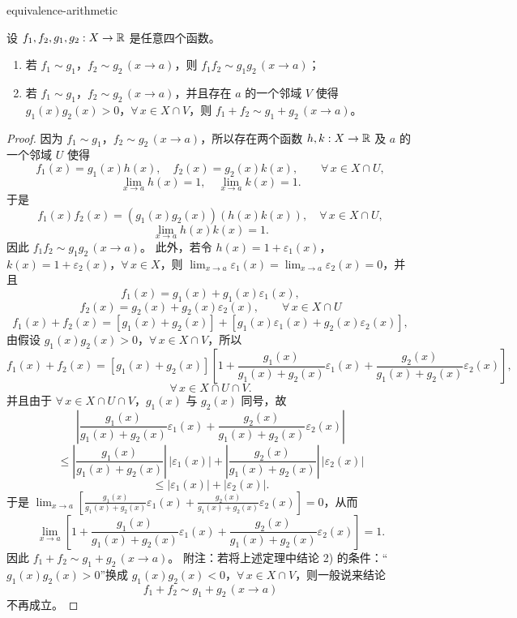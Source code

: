 \begin{mythm}{}{equivalence-arithmetic}

设 $f_1,f_2,g_1,g_2:X\to\mathbb{R}$ 是任意四个函数。

\begin{enumerate}[label=\arabic{enumi})]
\item 若 $f_1\sim g_1$，$f_2\sim g_2\,(x\to a)$，则 $f_1f_2\sim g_1g_2\,(x\to a)$；
\item 若 $f_1\sim g_1$，$f_2\sim g_2\,(x\to a)$，并且存在 $a$ 的一个邻域 $V$ 使得 $g_1(x)g_2(x)>0$，$\forall\,x\in X\cap V$，则 $f_1+f_2\sim g_1+g_2\,(x\to a)$。
\end{enumerate}

\end{mythm}

\begin{proof}

因为 $f_1\sim g_1$，$f_2\sim g_2\,(x\to a)$，所以存在两个函数 $h,k:X\to\mathbb{R}$ 及 $a$ 的一个邻域 $U$ 使得
\[f_1(x)=g_1(x)h(x),\quad f_2(x)=g_2(x)k(x),\qquad \forall\,x\in X\cap U,\]
\[\lim_{x\to a}h(x)=1,\quad \lim_{x\to a}k(x)=1.\]
于是
\[f_1(x)f_2(x)=(g_1(x)g_2(x))(h(x)k(x)),\quad \forall\,x\in X\cap U,\]
\[\lim_{x\to a}h(x)k(x)=1.\]
因此 $f_1f_2\sim g_1g_2\,(x\to a)$。
此外，若令 $h(x)=1+\varepsilon_1(x)$，$k(x)=1+\varepsilon_2(x)$，$\forall\,x\in X$，则 $\displaystyle\lim_{x\to a}\varepsilon_1(x)=\lim_{x\to a}\varepsilon_2(x)=0$，并且
\[f_1(x)=g_1(x)+g_1(x)\varepsilon_1(x),\]
\[f_2(x)=g_2(x)+g_2(x)\varepsilon_2(x),\qquad \forall\,x\in X\cap U\]
\[f_1(x)+f_2(x)=[g_1(x)+g_2(x)]+[g_1(x)\varepsilon_1(x)+g_2(x)\varepsilon_2(x)],\]
由假设 $g_1(x)g_2(x)>0$，$\forall\,x\in X\cap V$，所以
\[f_1(x)+f_2(x)=[g_1(x)+g_2(x)]\left[1+\frac{g_1(x)}{g_1(x)+g_2(x)}\varepsilon_1(x)+\frac{g_2(x)}{g_1(x)+g_2(x)}\varepsilon_2(x)\right],\]
\[\forall\,x\in X\cap U\cap V.\]
并且由于 $\forall\,x\in X\cap U\cap V$，$g_1(x)$ 与 $g_2(x)$ 同号，故
\[\left|\frac{g_1(x)}{g_1(x)+g_2(x)}\varepsilon_1(x)+\frac{g_2(x)}{g_1(x)+g_2(x)}\varepsilon_2(x)\right|\]
\[\leqslant\left|\frac{g_1(x)}{g_1(x)+g_2(x)}\right|\,|\varepsilon_1(x)|+\left|\frac{g_2(x)}{g_1(x)+g_2(x)}\right|\,|\varepsilon_2(x)|\]
\[\leqslant|\varepsilon_1(x)|+|\varepsilon_2(x)|.\]
于是 $\displaystyle\lim_{x\to a}\left[\frac{g_1(x)}{g_1(x)+g_2(x)}\varepsilon_1(x)+\frac{g_2(x)}{g_1(x)+g_2(x)}\varepsilon_2(x)\right]=0$，从而
\[\lim_{x\to a}\left[1+\frac{g_1(x)}{g_1(x)+g_2(x)}\varepsilon_1(x)+\frac{g_2(x)}{g_1(x)+g_2(x)}\varepsilon_2(x)\right]=1.\]
因此 $f_1+f_2\sim g_1+g_2\,(x\to a)$。
附注：若将上述定理中结论 2) 的条件：“$g_1(x)g_2(x)>0$”换成 $g_1(x)g_2(x)<0$，$\forall\,x\in X\cap V$，则一般说来结论
\[f_1+f_2\sim g_1+g_2\,(x\to a)\]
不再成立。

\end{proof}

